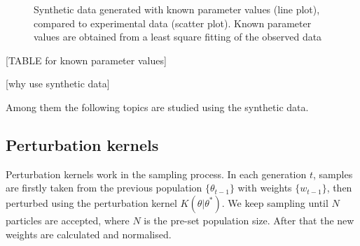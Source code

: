 \documentclass[12pt,a4paper]{report}
\begin{document}
\begin{figure}[h!]
    \begin{center}
    \end{center}
    
    \caption[Synthetic data generated with known parameter values]%
    {Synthetic data generated with known parameter values (line plot), compared to experimental data (scatter plot). Known parameter values are obtained from a least square fitting of the observed data} 
    \label{fig:infer_back_data}
    
\end{figure}

[TABLE for known parameter values]

[why use synthetic data]

Among them the following topics are studied using the synthetic data.

\subsection{Perturbation kernels}

Perturbation kernels work in the sampling process. In each generation $t$, samples are firstly taken from the previous population $\{\theta_{t-1}\}$ with weights $\{w_{t-1}\}$, then perturbed using the perturbation kernel $K(\theta|\theta^*)$. We keep sampling until $N$ particles are accepted, where $N$ is the pre-set population size. After that the new weights are calculated and normalised. 
\end{document}
